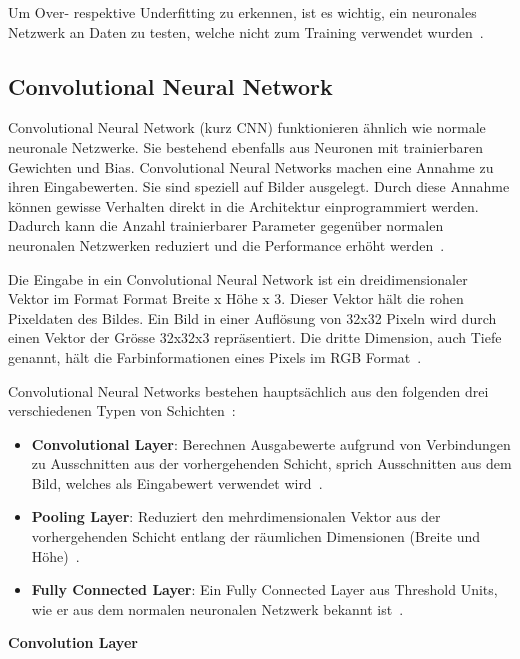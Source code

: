 Um Over- respektive Underfitting zu erkennen, ist es wichtig, ein neuronales Netzwerk an Daten zu testen, welche nicht zum Training verwendet wurden~\autocite{Krogh2008}.

\subsection{Convolutional Neural Network}
\label{chap:cnn}

Convolutional Neural Network (kurz CNN) funktionieren ähnlich wie normale neuronale Netzwerke. Sie bestehend ebenfalls aus Neuronen mit trainierbaren Gewichten und Bias. Convolutional Neural Networks machen eine Annahme zu ihren Eingabewerten. Sie sind speziell auf Bilder ausgelegt. Durch diese Annahme können gewisse Verhalten direkt in die Architektur einprogrammiert werden. Dadurch kann die Anzahl trainierbarer Parameter gegenüber normalen neuronalen Netzwerken reduziert und die Performance erhöht werden~\autocite{CNN}.

Die Eingabe in ein Convolutional Neural Network ist ein dreidimensionaler Vektor im Format Format Breite x Höhe x 3. Dieser Vektor hält die rohen Pixeldaten des Bildes. Ein Bild in einer Auflösung von 32x32 Pixeln wird durch einen Vektor der Grösse 32x32x3 repräsentiert. Die dritte Dimension, auch Tiefe genannt, hält die Farbinformationen eines Pixels im RGB Format~\autocite{CNN}.

Convolutional Neural Networks bestehen hauptsächlich aus den folgenden drei verschiedenen Typen von Schichten~\autocite{CNN}:

\begin{itemize}
    \item \textbf{Convolutional Layer}: Berechnen Ausgabewerte aufgrund von Verbindungen zu Ausschnitten aus der vorhergehenden Schicht, sprich Ausschnitten aus dem Bild, welches als Eingabewert verwendet wird~\autocite{CNN}.
    \item \textbf{Pooling Layer}: Reduziert den mehrdimensionalen Vektor aus der vorhergehenden Schicht entlang der räumlichen Dimensionen (Breite und Höhe)~\autocite{CNN}.
    \item \textbf{Fully Connected Layer}: Ein Fully Connected Layer aus Threshold Units, wie er aus dem normalen neuronalen Netzwerk bekannt ist~\autocite{CNN}.
\end{itemize}

\textbf{Convolution Layer}

\nopagebreak

